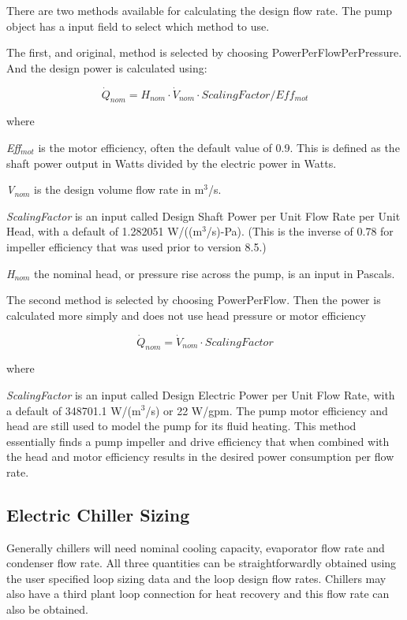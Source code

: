 There are two methods available for calculating the design flow rate. The pump object has a input field to select which method to use.

The first, and original, method is selected by choosing PowerPerFlowPerPressure. And the design power is calculated using:

\begin{equation}
\dot Q_{nom} = H_{nom} \cdot \dot V_{nom} \cdot ScalingFactor /Eff_{mot}
\end{equation}

where

\emph{Eff\(_{mot}\)} is the motor efficiency, often the default value of 0.9. This is defined as the shaft power output in Watts divided by the electric power in Watts.

\emph{V\(_{nom}\)} is the design volume flow rate in m\(^{3}\)/s.

\emph{ScalingFactor} is an input called Design Shaft Power per Unit Flow Rate per Unit Head, with a default of 1.282051 W/((m\(^{3}\)/s)-Pa). (This is the inverse of 0.78 for impeller efficiency that was used prior to version 8.5.)

\emph{H\(_{nom}\)} the nominal head, or pressure rise across the pump, is an input in Pascals.

The second method is selected by choosing PowerPerFlow. Then the power is calculated more simply and does not use head pressure or motor efficiency

\begin{equation}
\dot Q_{nom} = \dot V_{nom} \cdot ScalingFactor
\end{equation}

where

\emph{ScalingFactor} is an input called Design Electric Power per Unit Flow Rate, with a default of 348701.1 W/(m\(^{3}\)/s) or 22 W/gpm. The pump motor efficiency and head are still used to model the pump for its fluid heating. This method essentially finds a pump impeller and drive efficiency that when combined with the head and motor efficiency results in the desired power consumption per flow rate.

\subsection{Electric Chiller Sizing}\label{electric-chiller-sizing}

Generally chillers will need nominal cooling capacity, evaporator flow rate and condenser flow rate. All three quantities can be straightforwardly obtained using the user specified loop sizing data and the loop design flow rates.  Chillers may also have a third plant loop connection for heat recovery and this flow rate can also be obtained.

